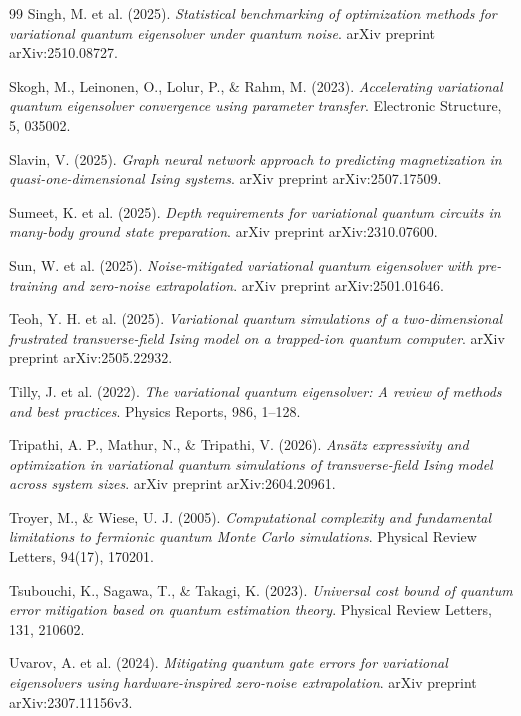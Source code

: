 \documentclass[11pt,a4paper,spanish]{book}
\begin{document}
\begin{thebibliography}{99}
 Singh, M. et al. (2025). \emph{Statistical benchmarking of optimization methods for variational quantum eigensolver under quantum noise}. arXiv preprint arXiv:2510.08727.

 Skogh, M., Leinonen, O., Lolur, P., \& Rahm, M. (2023). \emph{Accelerating variational quantum eigensolver convergence using parameter transfer}. Electronic Structure, 5, 035002.

 Slavin, V. (2025). \emph{Graph neural network approach to predicting magnetization in quasi-one-dimensional Ising systems}. arXiv preprint arXiv:2507.17509.

 Sumeet, K. et al. (2025). \emph{Depth requirements for variational quantum circuits in many-body ground state preparation}. arXiv preprint arXiv:2310.07600.

 Sun, W. et al. (2025). \emph{Noise-mitigated variational quantum eigensolver with pre-training and zero-noise extrapolation}. arXiv preprint arXiv:2501.01646.

 Teoh, Y. H. et al. (2025). \emph{Variational quantum simulations of a two-dimensional frustrated transverse-field Ising model on a trapped-ion quantum computer}. arXiv preprint arXiv:2505.22932.

 Tilly, J. et al. (2022). \emph{The variational quantum eigensolver: A review of methods and best practices}. Physics Reports, 986, 1--128.

 Tripathi, A. P., Mathur, N., \& Tripathi, V. (2026). \emph{Ans\"atz expressivity and optimization in variational quantum simulations of transverse-field Ising model across system sizes}. arXiv preprint arXiv:2604.20961.

 Troyer, M., \& Wiese, U. J. (2005). \emph{Computational complexity and fundamental limitations to fermionic quantum Monte Carlo simulations}. Physical Review Letters, 94(17), 170201.

 Tsubouchi, K., Sagawa, T., \& Takagi, K. (2023). \emph{Universal cost bound of quantum error mitigation based on quantum estimation theory}. Physical Review Letters, 131, 210602.

 Uvarov, A. et al. (2024). \emph{Mitigating quantum gate errors for variational eigensolvers using hardware-inspired zero-noise extrapolation}. arXiv preprint arXiv:2307.11156v3.


\end{thebibliography}
\end{document}
